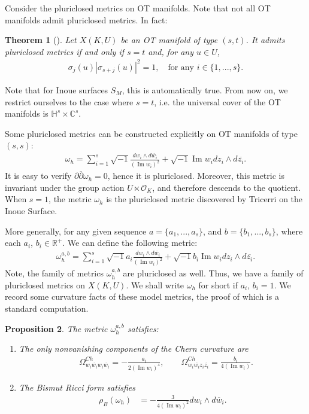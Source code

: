 \documentclass[12pt]{amsart}
\numberwithin{equation}{section}
\newtheorem{prop}{Proposition}
\newtheorem{thm}[prop]{Theorem}
\numberwithin{prop}{section}
\theoremstyle{definition}
\newcommand{\gw}{\omega}
\renewcommand{\bar}[1]{\overline{#1}}
\begin{document}
    Consider the pluriclosed metrics on OT manifolds.  Note that not all OT manifolds admit pluriclosed metrics.  In fact:
    \begin{thm}[\cite{otiman2022special, angella2024metric}]
    Let $X(K,U)$ be an OT manifold of type $(s,t)$. It admits pluriclosed metrics if and only if $s=t$ and, for any $u\in U$,
    \begin{align*}
        \sigma_j(u)|\sigma_{s+j}(u)|^2=1, \quad \text{for any }i\in\{1,...,s\}.
    \end{align*}
\end{thm}
\noindent Note that for Inoue surfaces $S_M$, this is automatically true. From now on, we restrict ourselves to the case where $s=t$, i.e. the universal cover of the OT manifolds is $\mathbb{H}^s\times\mathbb{C}^s$.

Some pluriclosed metrics can be constructed explicitly on OT manifolds of type $(s,s)$:
\begin{align}\label{e:model metric}
    \omega_h = \sum_{i=1}^s\sqrt{-1}\frac{dw_i\wedge d\bar{w_i}}{(\operatorname{Im}w_i)^2} + \sqrt{-1}\operatorname{Im}w_i dz_i\wedge d\bar{z_i}.
\end{align}
It is easy to verify $\partial\bar{\partial}\omega_h=0$, hence it is pluriclosed.  Moreover, this metric is invariant under the group action $U\ltimes \mathcal{O}_K$, and therefore descends to the quotient. When $s=1$, the metric $\omega_h$ is the pluriclosed metric discovered by Tricerri \cite{tricerri1982some} on the Inoue Surface. 

More generally, for any given sequence $a = \{a_1,...,a_s\}$, and $b=\{b_1,...,b_s\}$, where each $a_i$, $b_i\in \mathbb{R}^+$. We can define the following metric:
\begin{align}\label{e:AB model initial metric}
    \omega^{a,b}_h = \sum_{i=1}^s\sqrt{-1}a_i\frac{dw_i\wedge d\bar{w_i}}{(\operatorname{Im}w_i)^2} + \sqrt{-1}b_i\operatorname{Im}w_i dz_i\wedge d\bar{z_i}.
\end{align}
Note, the family of metrics $\omega^{a,b}_h$ are pluriclosed as well. Thus, we have a family of pluriclosed metrics on $X(K,U)$. We shall write $\omega_h$ for short if $a_i$, $b_i = 1$.  We record some curvature facts of these model metrics, the proof of which is a standard computation.

\begin{prop} \label{p:modelcurvature} The metric $\gw^{a,b}_h$ satisfies:
\begin{enumerate}
    \item The only nonvanishing components of the Chern curvature are
    \begin{align*}
        &\Omega^{Ch}_{w_i\bar{w_i}w_i\bar{w_i}}=-\frac{a_i}{2(\operatorname{Im}w_i)^4}, \qquad 
        \Omega^{Ch}_{w_i\bar{w_i}z_i\bar{z_i}}=\frac{b_i}{4(\operatorname{Im}w_i)}.
    \end{align*}
    \item The Bismut Ricci form satisfies
    \begin{align*}
        \rho_B(\omega_h) &= -\frac{3}{4(\operatorname{Im}w_i)^2}dw_i\wedge d\bar{w}_i.
    \end{align*}
\end{enumerate}
\end{prop}
\end{document}
